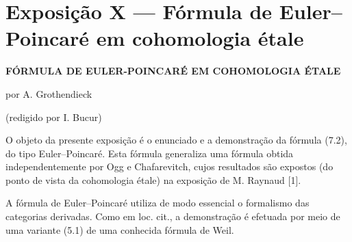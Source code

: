 \section*{Exposição X --- Fórmula de Euler--Poincaré em cohomologia étale}

\begin{center}
\textbf{FÓRMULA DE EULER-POINCARÉ EM COHOMOLOGIA ÉTALE}

por A. Grothendieck

(redigido por I. Bucur)
\end{center}

O objeto da presente exposição é o enunciado e a demonstração da fórmula (7.2), do tipo Euler--Poincaré. Esta fórmula generaliza uma fórmula obtida independentemente por Ogg e Chafarevitch, cujos resultados são expostos (do ponto de vista da cohomologia étale) na exposição de M. Raynaud [1].

A fórmula de Euler--Poincaré utiliza de modo essencial o formalismo das categorias derivadas. Como em loc. cit., a demonstração é efetuada por meio de uma variante (5.1) de uma conhecida fórmula de Weil.
